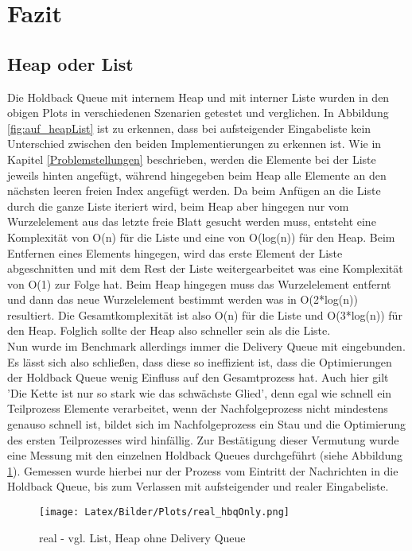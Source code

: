 \section{Fazit}

\subsection{Heap oder List}

Die Holdback Queue mit internem Heap und mit interner Liste wurden in den obigen Plots in verschiedenen Szenarien getestet und verglichen. In Abbildung \ref{fig:auf_heapList} ist zu erkennen, dass bei aufsteigender Eingabeliste kein Unterschied zwischen den beiden Implementierungen zu erkennen ist. Wie in Kapitel \ref{Problemstellungen} beschrieben, werden die Elemente bei der Liste jeweils hinten angefügt, während hingegeben beim Heap alle Elemente an den nächsten leeren freien Index angefügt werden. Da beim Anfügen an die Liste durch die ganze Liste iteriert wird, beim Heap aber hingegen nur vom Wurzelelement aus das letzte freie Blatt gesucht werden muss, entsteht eine Komplexität von O(n) für die Liste und eine von O(log(n)) für den Heap. Beim Entfernen eines Elements hingegen, wird das erste Element der Liste abgeschnitten und mit dem Rest der Liste weitergearbeitet was eine Komplexität von O(1) zur Folge hat. Beim Heap hingegen muss das Wurzelelement entfernt und dann das neue Wurzelelement bestimmt werden was in O(2*log(n)) resultiert. Die Gesamtkomplexität ist also O(n) für die Liste und O(3*log(n)) für den Heap. Folglich sollte der Heap also schneller sein als die Liste.\\
Nun wurde im Benchmark allerdings immer die Delivery Queue mit eingebunden. Es lässt sich also schließen, dass diese so ineffizient ist, dass die Optimierungen der Holdback Queue wenig Einfluss auf den Gesamtprozess hat. Auch hier gilt 'Die Kette ist nur so stark wie das schwächste Glied', denn egal wie schnell ein Teilprozess Elemente verarbeitet, wenn der Nachfolgeprozess nicht mindestens genauso schnell ist, bildet sich im Nachfolgeprozess ein Stau und die Optimierung des ersten Teilprozesses wird hinfällig. Zur Bestätigung dieser Vermutung wurde eine Messung mit den einzelnen Holdback Queues durchgeführt (siehe Abbildung \ref{fig:real_hbqOnly}). Gemessen wurde hierbei nur der Prozess vom Eintritt der Nachrichten in die Holdback Queue, bis zum Verlassen mit aufsteigender und realer Eingabeliste.

\begin{figure}[htbp]
\begin{center}
\texttt{[image: Latex/Bilder/Plots/real\_hbqOnly.png]}
\caption{\label{fig:real_hbqOnly} real - vgl. List, Heap ohne Delivery Queue} 
\end{center}
\end{figure}

